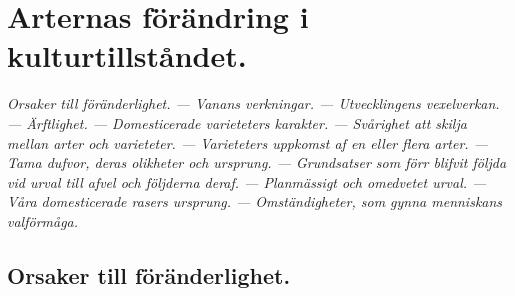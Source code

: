 


\chapter[Kulturtillståndet]{Arternas förändring i kulturtillståndet.}

{\it
Orsaker till föränderlighet. — Vanans verkningar. — Utvecklingens vexelverkan. — Ärftlighet. — Domesticerade varieteters karakter. — Svårighet att skilja mellan arter och varieteter. — Varieteters uppkomst af en eller flera arter. — Tama dufvor, deras olikheter och ursprung. — Grundsatser som förr blifvit följda vid urval till afvel och följderna deraf. — Planmässigt och omedvetet urval. — Våra domesticerade rasers ursprung. — Omständigheter, som gynna menniskans valförmåga.
}\\[0.5cm]


\section{Orsaker till föränderlighet.}


